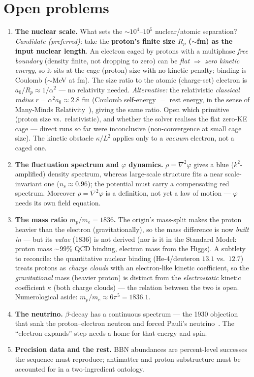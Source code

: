 \documentclass[11pt]{article}
\newcommand{\grad}{\nabla}
\begin{document}
\section{Open problems}\label{sec:open}
\begin{enumerate}
\item \textbf{The nuclear scale.} What sets the ${\sim}10^4$--$10^5$ nuclear/atomic separation?
\emph{Candidate (preferred):} take the \textbf{proton's finite size $R_p$ (${\sim}$fm) as the input
nuclear length}. An electron caged by protons with a multiphase \emph{free boundary} (density finite, not
dropping to zero) can be \emph{flat} $\Rightarrow$ \emph{zero kinetic energy}, so it sits at the cage
(proton) size with no kinetic penalty; binding is Coulomb (${\sim}$MeV at fm). The size ratio to the
atomic (charge-set) electron is $a_0/R_p\approx1/\alpha^2$ --- no relativity needed. \emph{Alternative:}
the relativistic \emph{classical radius} $r=\alpha^2 a_0\approx2.8$ fm (Coulomb self-energy $=$ rest
energy, in the sense of Many-Minds Relativity~\cite{mmr}), giving the same ratio. Open which primitive
(proton size vs.\ relativistic), and whether the solver realises the flat zero-KE cage --- direct runs so
far were inconclusive (non-convergence at small cage size). The kinetic obstacle $\kappa/L^2$ applies only
to a \emph{vacuum} electron, not a caged one.
\item \textbf{The fluctuation spectrum and $\varphi$ dynamics.} $\rho=\grad^2\varphi$ gives a blue
($k^2$-amplified) density spectrum, whereas large-scale structure fits a near
scale-invariant one ($n_s\approx0.96$); the potential must carry a compensating red spectrum.
Moreover $\rho=\grad^2\varphi$ is a definition, not yet a law of motion --- $\varphi$ needs its own
field equation.
\item \textbf{The mass ratio $m_p/m_e=1836$.} The origin's mass-split makes the proton heavier than the
electron (gravitationally), so the mass difference is now \emph{built in} --- but its \emph{value}
($1836$) is not derived (nor is it in the Standard Model: proton mass ${\sim}99\%$ QCD binding, electron
mass from the Higgs). A subtlety to reconcile: the quantitative nuclear binding (He-4/deuteron $13.1$
vs.\ $12.7$) treats protons as \emph{charge clouds} with an electron-like kinetic coefficient, so the
\emph{gravitational} mass (heavier proton) is distinct from the \emph{electrostatic} kinetic coefficient
$\kappa$ (both charge clouds) --- the relation between the two is open. Numerological aside:
$m_p/m_e\approx6\pi^5=1836.1$.
\item \textbf{The neutrino.} $\beta$-decay has a continuous spectrum --- the 1930 objection that sank
the proton--electron neutron and forced Pauli's neutrino~\cite{pauli}. The ``electron expands'' step
needs a home for that energy and spin.
\item \textbf{Precision data and the rest.} BBN abundances are
percent-level successes the sequence must reproduce; antimatter and proton substructure must be
accounted for in a two-ingredient ontology.
\end{enumerate}
\end{document}
